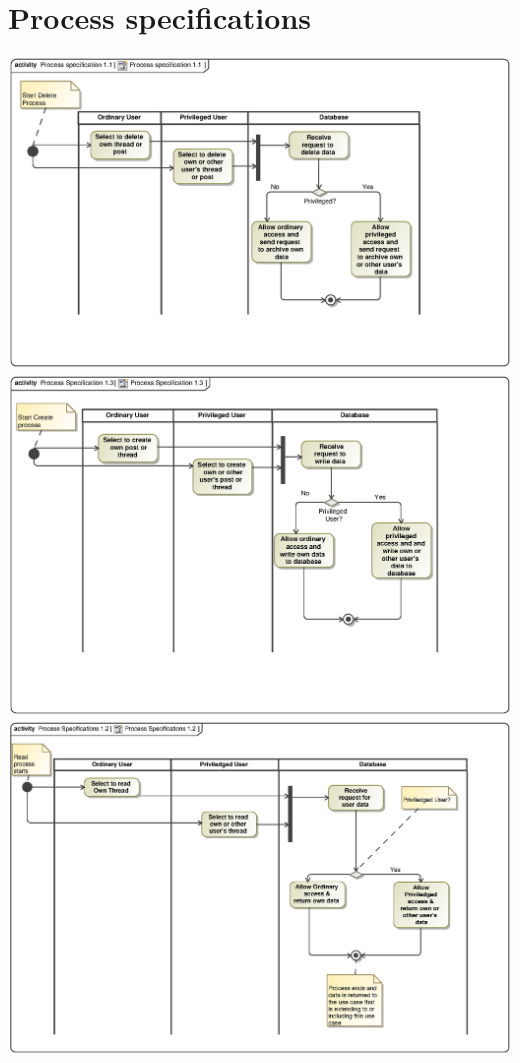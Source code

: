 \documentclass{scrreprt}
\begin{document}
\chapter{Process specifications}							%
\includegraphics[scale=.9]{ProcessSpecificationCRUD1.eps}\\
\includegraphics[scale=.9]{ProcessSpecificationCRUD3.eps}\\
\includegraphics[scale=.9]{ProcessSpecificationsCRUD2.eps}
\end{document}
